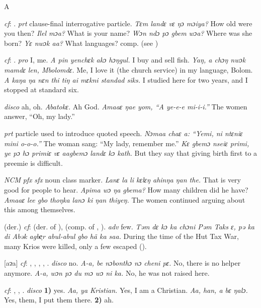 \begin{letter}{A}

 \textit{cf}: . \textit{prt} clause-final interrogative particle. \textit{Tɛm landɛ vɛ ŋɔ mɔiya?} How old were you then? \textit{Ilel mɔa?} What is your name? \textit{Wɔn ndɔ pɔ gbem wɔa?} Where was she born? \textit{Yɛ nwɔk aa?} What languages? comp.  (see )

 \textit{cf}: . \textit{pro} I, me. \textit{A pin yenchɛk akɔ hɔŋgul.} I buy and sell fish. \textit{Yaŋ, a chɔŋ nwɔk mamdɛ len, Mbolomdɛ.} Me, I love it (the church service) in my language, Bolom. \textit{A kaŋa ŋa nɛn thi tiŋ ai mɛkni standad siks.} I studied here for two years, and I stopped at standard six. 

 \textit{disco} ah, oh. \textit{Abatokɛ.} Ah God. \textit{Amaaɛ ŋae yom, “A ye-e-e mi-i-i.”} The women answer, “Oh, my lady.”

 \textit{prt} particle used to introduce quoted speech. \textit{Nɔmaa chaɛ a: “Yemi, ni ntɛniɛ mini o-o-o.”} The woman sang: “My lady, remember me.” \textit{Kɛ gbemɔ nseiɛ primi, ye pɔ hɔ primiɛ vɛ aagbemɔ landɛ kɔ kath.} But they say that giving birth first to a preemie is difficult.

 \textit{NCM} \textit{pfx} \textit{sfx} noun class marker. \textit{Lanɛ la li kɛlɛŋ ahinŋa ŋan the.} That is very good for people to hear. \textit{Apima wɔ ŋa gbema?} How many children did he have? \textit{Amaaɛ lee gbo thoŋka lanɔ ki ŋan thiyeŋ.} The women continued arguing about this among themselves.

 (der.) \textit{cf}:  (der. of ),  (comp. of , ). \textit{adv} few. \textit{Təm dɛ kɔ ka chɔni Pəm Taks ɛ, pə ka di Abək agbe̹r abul-abul gbo hã ka saa.} During the time of the Hut Tax War, many Krios were killed, only a few escaped (\citealt{Pichl1967}). 

 [aɂa] \textit{cf}: , , , , . \textit{disco} no. \textit{A-a, be nɔbonthɔ nɔ cheni pɛ.} No, there is no helper anymore. \textit{A-a, wɔn pɔ du mɔ wɔ ni ka.} No, he was not raised here.

 \textit{cf}: , , . \textit{disco} \textbf{1)} yes. \textit{Aa, ya Kristian.} Yes, I am a Christian. \textit{Aa, han, a bɛ ŋalɔ.} Yes, them, I put them there. \textbf{2)} ah.


\end{letter}
